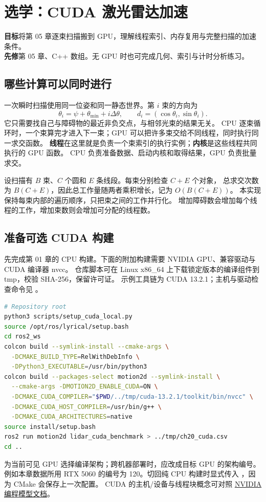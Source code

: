 \chapter{选学：CUDA 激光雷达加速}
\begin{notebox}
\textbf{目标}\quad 将第 05 章逐束扫描搬到 GPU，理解线程索引、内存复用与完整扫描的加速条件。\\
\textbf{先修}\quad 第 05 章、C++ 数组。无 GPU 时也可完成几何、索引与计时分析练习。
\end{notebox}
\section{哪些计算可以同时进行}
一次瞬时扫描使用同一位姿和同一静态世界。第 $i$ 束的方向为
\[
 \theta_i=\psi+\theta_{\min}+i\Delta\theta,\qquad d_i=(\cos\theta_i,\sin\theta_i).
\]
它只需要找自己与障碍物的最近非负交点，与相邻光束的结果无关。
CPU 逐束循环时，一个束算完才进入下一束；GPU 可以把许多束交给不同线程，同时执行同一求交函数。
\textbf{线程}在这里就是负责一个束索引的执行实例；\textbf{内核}是这些线程共同执行的 GPU 函数。
CPU 负责准备数据、启动内核和取得结果，GPU 负责批量求交。

设扫描有 $B$ 束、$C$ 个圆和 $E$ 条线段。每束分别检查 $C+E$ 个对象，
总求交次数为 $B(C+E)$，因此总工作量随两者乘积增长，记为 $O(B(C+E))$。
本实现保持每束内部的遍历顺序，只把束之间的工作并行化。
增加障碍数会增加每个线程的工作，增加束数则会增加可分配的线程数。

\section{准备可选 CUDA 构建}
先完成第 01 章的 CPU 构建。下面的附加构建需要 NVIDIA GPU、兼容驱动与 CUDA 编译器 nvcc。
仓库脚本可在 Linux x86\_64 上下载锁定版本的编译组件到 tmp，校验 SHA-256，保留许可证。
示例工具链为 CUDA 13.2.1；主机与驱动检查命令见 。
\begin{lstlisting}[language=bash,numbers=none]
# Repository root
python3 scripts/setup_cuda_local.py
source /opt/ros/lyrical/setup.bash
cd ros2_ws
colcon build --symlink-install --cmake-args \
  -DCMAKE_BUILD_TYPE=RelWithDebInfo \
  -DPython3_EXECUTABLE=/usr/bin/python3
colcon build --packages-select motion2d --symlink-install \
  --cmake-args -DMOTION2D_ENABLE_CUDA=ON \
  -DCMAKE_CUDA_COMPILER="$PWD/../tmp/cuda-13.2.1/toolkit/bin/nvcc" \
  -DCMAKE_CUDA_HOST_COMPILER=/usr/bin/g++ \
  -DCMAKE_CUDA_ARCHITECTURES=native
source install/setup.bash
ros2 run motion2d lidar_cuda_benchmark > ../tmp/ch20_cuda.csv
cd ..
\end{lstlisting}
\code{native} 为当前可见 GPU 选择编译架构；跨机器部署时，应改成目标 GPU 的架构编号。
例如本章数据所用 RTX 5060 的编号为 120。切回纯 CPU 构建时显式传入
，因为 CMake 会保存上一次配置。
CUDA 的主机/设备与线程块概念可对照
\href{https://docs.nvidia.com/cuda/cuda-programming-guide/01-introduction/programming-model.html}{NVIDIA 编程模型文档}。

